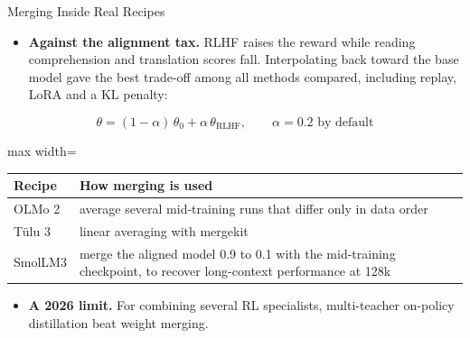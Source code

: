 \begin{frame}{Merging Inside Real Recipes}
    \begin{itemize}\itemsep0.3em
        \item \textbf{Against the alignment tax.} RLHF raises the reward while reading comprehension and translation scores fall. Interpolating back toward the base model gave the best trade-off among all methods compared, including replay, LoRA and a KL penalty:
    \end{itemize}
    \[
        \theta=(1-\alpha)\,\theta_0+\alpha\,\theta_{\text{RLHF}}, \qquad \alpha=0.2 \text{ by default}
    \]
    \begin{center}
    \small
    \begin{adjustbox}{max width=\linewidth}\begin{tabular}{l>{\raggedright\arraybackslash}p{10.8cm}}
        \toprule
        \textbf{Recipe} & \textbf{How merging is used} \\
        \midrule
        OLMo 2 & average several mid-training runs that differ only in data order \\
        T\"ulu 3 & linear averaging with mergekit \\
        SmolLM3 & merge the aligned model 0.9 to 0.1 with the mid-training checkpoint, to recover long-context performance at 128k \\
        \bottomrule
    \end{tabular}\end{adjustbox}
    \end{center}
    \begin{itemize}\itemsep0.3em
        \item \textbf{A 2026 limit.} For combining several RL specialists, multi-teacher on-policy distillation beat weight merging.
    \end{itemize}
\end{frame}

